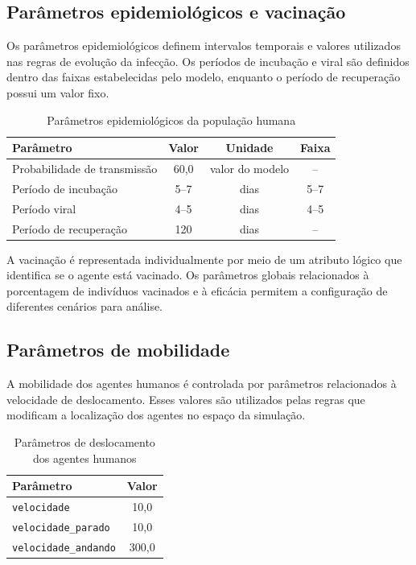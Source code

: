 \subsection{Parâmetros epidemiológicos e vacinação}

Os parâmetros epidemiológicos definem intervalos temporais e valores utilizados nas regras de evolução da infecção. Os períodos de incubação e viral são definidos dentro das faixas estabelecidas pelo modelo, enquanto o período de recuperação possui um valor fixo.

\begin{table}[htb]
    \centering
    \caption{Parâmetros epidemiológicos da população humana}
    \label{tab:parametros-epidemiologicos}
    \begin{tabular}{l c c c}
        \hline
        \textbf{Parâmetro} & \textbf{Valor} & \textbf{Unidade} & \textbf{Faixa} \\
        \hline
        Probabilidade de transmissão & 60,0 & valor do modelo & -- \\
        Período de incubação & 5--7 & dias & 5--7 \\
        Período viral & 4--5 & dias & 4--5 \\
        Período de recuperação & 120 & dias & -- \\
        \hline
    \end{tabular}
\end{table}

A vacinação é representada individualmente por meio de um atributo lógico que identifica se o agente está vacinado. Os parâmetros globais relacionados à porcentagem de indivíduos vacinados e à eficácia permitem a configuração de diferentes cenários para análise.

\subsection{Parâmetros de mobilidade}

A mobilidade dos agentes humanos é controlada por parâmetros relacionados à velocidade de deslocamento. Esses valores são utilizados pelas regras que modificam a localização dos agentes no espaço da simulação.

\begin{table}[htb]
    \centering
    \caption{Parâmetros de deslocamento dos agentes humanos}
    \label{tab:parametros-deslocamento}
    \begin{tabular}{l c}
        \hline
        \textbf{Parâmetro} & \textbf{Valor} \\
        \hline
        \texttt{velocidade} & 10,0 \\
        \texttt{velocidade\_parado} & 10,0 \\
        \texttt{velocidade\_andando} & 300,0 \\
        \hline
    \end{tabular}
\end{table}

